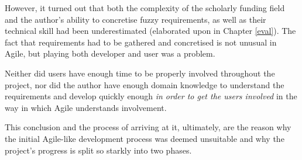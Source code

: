 However, it turned out that both the complexity of the scholarly funding field and the author's ability to concretise fuzzy requirements, as well as their technical skill had been underestimated (elaborated upon in Chapter \ref{eval}). The fact that requirements had to be gathered and concretised is not unusual in Agile, but playing both developer and user was a problem. 

Neither did users have enough time to be properly involved throughout the project, nor did the author have enough domain knowledge to understand the requirements and develop quickly enough \emph{in order to get the users involved} in the way in which Agile understands involvement.

This conclusion and the process of arriving at it, ultimately, are the reason why the initial Agile-like development process was deemed unsuitable and why the project's progress is split so starkly into two phases.

